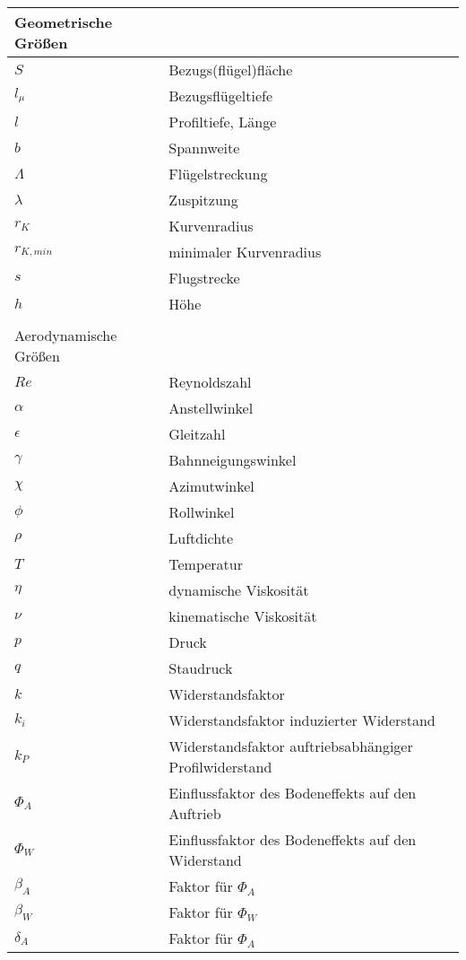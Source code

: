 \begin{table}[H]
	\begin{tabular}{ll}
		Geometrische Größen\\
		\hline
		$S$					& Bezugs(flügel)fläche\\
		$l_\mu$				& Bezugsflügeltiefe\\
		$l$					& Profiltiefe, Länge\\
		$b$					& Spannweite\\
		$\Lambda$			& Flügelstreckung\\
		$\lambda$			& Zuspitzung\\
		$r_K$				& Kurvenradius\\
		$r_{K,min}$			& minimaler Kurvenradius\\
		$s$					& Flugstrecke\\
		$h$					& Höhe\\
		\\
		Aerodynamische Größen\\
		\hline
		$Re$				& Reynoldszahl\\
		$\alpha$			& Anstellwinkel\\
		$\epsilon$			& Gleitzahl\\
		$\gamma$			& Bahnneigungswinkel\\
		$\chi$				& Azimutwinkel\\
		$\phi$				& Rollwinkel\\
		$\rho$				& Luftdichte\\
		$T$					& Temperatur\\
		$\eta$				& dynamische Viskosität\\
		$\nu$				& kinematische Viskosität\\
		$p$					& Druck\\
		$q$					& Staudruck\\
		$k$					& Widerstandsfaktor\\
		$k_i$				& Widerstandsfaktor induzierter Widerstand\\
		$k_P$				& Widerstandsfaktor auftriebsabhängiger Profilwiderstand\\
		$\Phi_A$			& Einflussfaktor des Bodeneffekts auf den Auftrieb\\
		$\Phi_W$			& Einflussfaktor des Bodeneffekts auf den Widerstand\\
		$\beta_A$			& Faktor für $\Phi_A$\\
		$\beta_W$			& Faktor für $\Phi_W$\\
		$\delta_A$			& Faktor für $\Phi_A$\\

\end{tabular}
\end{table}
